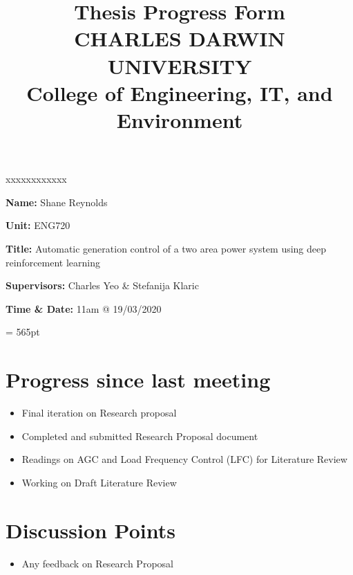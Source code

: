 \documentclass[12pt]{article}
\title{	
		Thesis Progress Form\\
		CHARLES DARWIN UNIVERSITY\\
		College of Engineering, IT, and Environment
	  }
\author{}
\date{}
\begin{document}
	
	\maketitle
	
	\begin{namelist}{xxxxxxxxxxxx}
		\item[{\bf Name:}]
			Shane Reynolds
		\item[{\bf Unit:}]
			ENG720
		\item[{\bf Title:}]
			Automatic generation control of a two area power system using deep reinforcement learning
		\item[{\bf Supervisors:}]
			Charles Yeo \& Stefanija Klaric
		\item[{\bf Time \& Date:}] 11am @ 19/03/2020
			
	\end{namelist}
	
	\pagestyle{plain} %
	\textheight = 565pt %
	
	\section{Progress since last meeting}
	\begin{itemize}
		\item Final iteration on Research proposal
		\item Completed and submitted Research Proposal document
		\item Readings on AGC and Load Frequency Control (LFC) for Literature Review
		\item Working on Draft Literature Review
	\end{itemize}
	\section{Discussion Points}
	\begin{itemize}
		\item Any feedback on Research Proposal
	\end{itemize}
\end{document}
